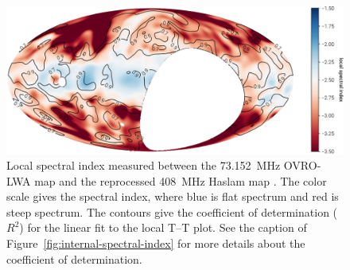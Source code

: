 \begin{bibunit}
\begin{figure}[t]
    \centering
    \includegraphics[height=0.32\textheight]{figures/chapter3/better-haslam-spectral-index}
    \caption{
        Local spectral index measured between the 73.152~MHz OVRO-LWA map and the reprocessed
        408~MHz Haslam map \citep{2015MNRAS.451.4311R}.  The color scale gives the spectral index,
        where blue is flat spectrum and red is steep spectrum. The contours give the coefficient of
        determination ($R^2$) for the linear fit to the local T--T plot. See the caption of
        Figure~\ref{fig:internal-spectral-index} for more details about the coefficient of
        determination.
    }
    \label{fig:haslam-spectral-index}
\end{figure}


\end{bibunit}
